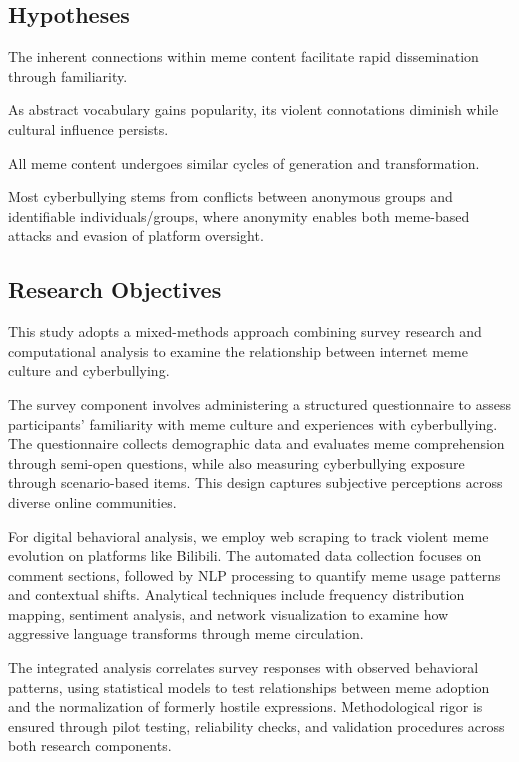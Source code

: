 \documentclass[12pt,a4paper]{ctexart}
\theoremstyle{MyLineTheoremStyle}
\theoremstyle{MyBlockTheoremStyle}
\theoremstyle{MySubsubsectionStyle}
\begin{document}
\subsection{Hypotheses}

The inherent connections within meme content facilitate rapid dissemination through familiarity.

As abstract vocabulary gains popularity, its violent connotations diminish while cultural influence persists.

All meme content undergoes similar cycles of generation and transformation.

Most cyberbullying stems from conflicts between anonymous groups and identifiable individuals/groups, where anonymity enables both meme-based attacks and evasion of platform oversight.

\subsection{Research Objectives}

This study adopts a mixed-methods approach combining survey research and computational analysis to examine the relationship between internet meme culture and cyberbullying.

The survey component involves administering a structured questionnaire to assess participants' familiarity with meme culture and experiences with cyberbullying. The questionnaire collects demographic data and evaluates meme comprehension through semi-open questions, while also measuring cyberbullying exposure through scenario-based items. This design captures subjective perceptions across diverse online communities.

For digital behavioral analysis, we employ web scraping to track violent meme evolution on platforms like Bilibili. The automated data collection focuses on comment sections, followed by NLP processing to quantify meme usage patterns and contextual shifts. Analytical techniques include frequency distribution mapping, sentiment analysis, and network visualization to examine how aggressive language transforms through meme circulation.

The integrated analysis correlates survey responses with observed behavioral patterns, using statistical models to test relationships between meme adoption and the normalization of formerly hostile expressions. Methodological rigor is ensured through pilot testing, reliability checks, and validation procedures across both research components.
\end{document}
